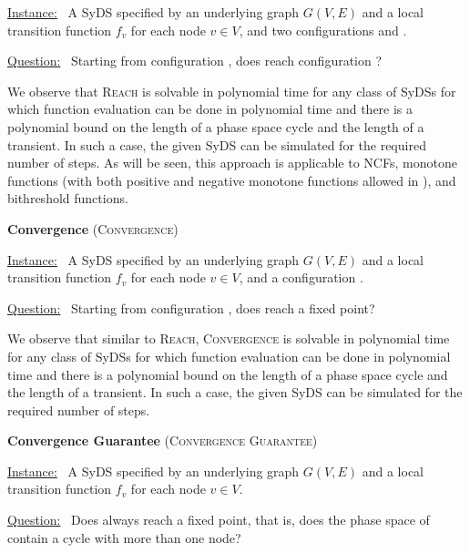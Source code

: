 \smallskip
\noindent
\underline{\textsf{Instance:}}~ A SyDS \cals{} specified 
by an underlying
graph $G(V,E)$ and a local transition function $f_v$ for each node $v \in V$,
and two configurations \calc{} and \cald{}. 

\noindent
\underline{\textsf{Question:}}~ Starting from configuration \calc,
does  \cals{} reach configuration \cald? 

We observe that \textsc{Reach} is solvable in polynomial time for
any class of SyDSs for which function evaluation can be done in
polynomial time and there is a polynomial bound on the length of a
phase space cycle and the length of a transient.  In such a case,
the given SyDS can be simulated for the required number of steps.
As will be seen, this approach is applicable to NCFs, monotone
functions (with both positive and negative monotone functions allowed
in \cals{}), and bithreshold functions.

\smallskip
\noindent
\textbf{Convergence} (\textsc{Convergence})

\smallskip
\noindent
\underline{\textsf{Instance:}}~ A SyDS \cals{} specified 
by an underlying
graph $G(V,E)$ and a local transition function $f_v$ for each node $v \in V$,
and a configuration \calc{}. 

\noindent
\underline{\textsf{Question:}}~ Starting from configuration \calc,
does  \cals{} reach a fixed point? 

We observe that similar to \textsc{Reach}, \textsc{Convergence} is
solvable in polynomial time for any class of SyDSs for which function
evaluation can be done in polynomial time and there is a polynomial
bound on the length of a phase space cycle and the length of a
transient.  In such a case, the given SyDS can be simulated for the
required number of steps.


\smallskip
\noindent
\textbf{Convergence Guarantee} (\textsc{Convergence Guarantee})

\smallskip
\noindent
\underline{\textsf{Instance:}}~ A SyDS \cals{} specified 
by an underlying
graph $G(V,E)$ and a local transition function $f_v$ for each node $v \in V$. 

\noindent
\underline{\textsf{Question:}}~ Does  \cals{} always reach a fixed point,
that is, does the phase space of  \cals{} contain a cycle with more than one node? 

